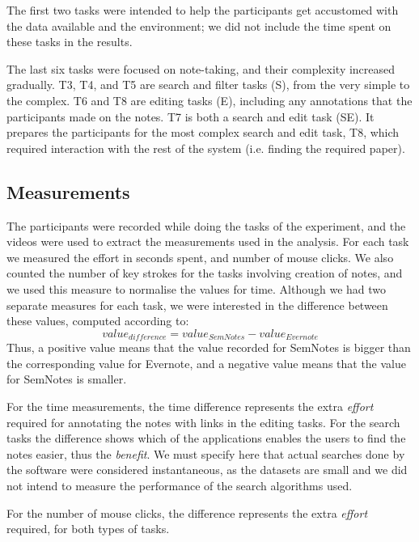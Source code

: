 The first two tasks were intended to help the participants get accustomed with the data available and the environment; we did not include the time spent on these tasks in the results. 

The last six tasks were focused on note-taking, and their complexity increased gradually. T3, T4, and T5 are search and filter tasks (S), from the very simple to the complex. T6 and T8 are editing tasks (E), including any annotations that the participants made on the notes. T7 is both a search and edit task (SE). It prepares the participants for the most complex search and edit task, T8, which required interaction with the rest of the system (i.e. finding the required paper).

\subsection{Measurements} 

The participants were recorded while doing the tasks of the experiment, and the videos were used to extract the measurements used in the analysis. 
For each task we measured the effort in seconds spent, and number of mouse clicks. 
We also counted the number of key strokes for the tasks involving creation of notes, and we used this measure to normalise the values for time. 
Although we had two separate measures for each task, we were interested in the difference between these values, computed according to:
$$
value_{difference} = value_{SemNotes} - value_{Evernote}
$$
Thus, a positive value means that the value recorded for SemNotes is bigger than the corresponding value for Evernote, and a negative value means that the value for SemNotes is smaller. 

For the time measurements, the time difference represents the extra \emph{effort} required for annotating the notes with links in the editing tasks. For the search tasks the difference shows which of the applications enables the users to find the notes easier, thus the \emph{benefit}. We must specify here that actual searches done by the software were considered instantaneous, as the datasets are small and we did not intend to measure the performance of the search algorithms used.

For the number of mouse clicks, the difference represents the extra \emph{effort} required, for both types of tasks.

